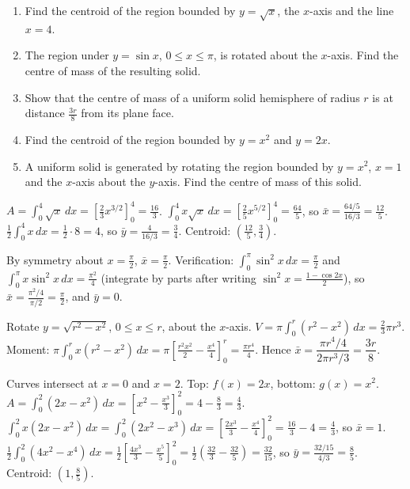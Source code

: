 \documentclass[11pt]{article}
\begin{document}
\begin{exercice}[Practice]
\begin{enumerate}
\item Find the centroid of the region bounded by $y = \sqrt{x}$, the $x$-axis and the line $x = 4$.
\item The region under $y = \sin x$, $0 \le x \le \pi$, is rotated about the $x$-axis. Find the centre of mass of the resulting solid.
\item Show that the centre of mass of a uniform solid hemisphere of radius $r$ is at distance $\tfrac{3r}{8}$ from its plane face.
\item Find the centroid of the region bounded by $y = x^2$ and $y = 2x$.
\item A uniform solid is generated by rotating the region bounded by $y = x^2$, $x = 1$ and the $x$-axis about the $y$-axis. Find the centre of mass of this solid.
\end{enumerate}
\end{exercice}

\begin{corrige}[Exercise 1]
$A = \int_0^4 \sqrt{x}\,dx = \left[\tfrac23 x^{3/2}\right]_0^4 = \tfrac{16}{3}$.
$\int_0^4 x\sqrt{x}\,dx = \left[\tfrac25 x^{5/2}\right]_0^4 = \tfrac{64}{5}$, so $\bar{x} = \tfrac{64/5}{16/3} = \tfrac{12}{5}$.
$\tfrac12\int_0^4 x\,dx = \tfrac12\cdot 8 = 4$, so $\bar{y} = \tfrac{4}{16/3} = \tfrac34$. Centroid: $\left(\tfrac{12}{5}, \tfrac34\right)$.
\end{corrige}

\begin{corrige}[Exercise 2]
By symmetry about $x = \tfrac{\pi}{2}$, $\bar{x} = \tfrac{\pi}{2}$. Verification: $\int_0^\pi \sin^2 x\,dx = \tfrac{\pi}{2}$ and $\int_0^\pi x\sin^2 x\,dx = \tfrac{\pi^2}{4}$ (integrate by parts after writing $\sin^2 x = \tfrac{1-\cos 2x}{2}$), so $\bar{x} = \tfrac{\pi^2/4}{\pi/2} = \tfrac{\pi}{2}$, and $\bar{y} = 0$.
\end{corrige}

\begin{corrige}[Exercise 3]
Rotate $y = \sqrt{r^2 - x^2}$, $0 \le x \le r$, about the $x$-axis. $V = \pi\int_0^r (r^2 - x^2)\,dx = \tfrac23\pi r^3$. Moment: $\pi\int_0^r x(r^2 - x^2)\,dx = \pi\left[\tfrac{r^2x^2}{2} - \tfrac{x^4}{4}\right]_0^r = \tfrac{\pi r^4}{4}$. Hence $\bar{x} = \dfrac{\pi r^4/4}{2\pi r^3/3} = \dfrac{3r}{8}$.
\end{corrige}

\begin{corrige}[Exercise 4]
Curves intersect at $x=0$ and $x=2$. Top: $f(x)=2x$, bottom: $g(x)=x^2$.
$A = \int_0^2 (2x - x^2)\,dx = \left[x^2 - \frac{x^3}{3}\right]_0^2 = 4 - \frac{8}{3} = \frac{4}{3}$.
$\int_0^2 x(2x - x^2)\,dx = \int_0^2 (2x^2 - x^3)\,dx = \left[\frac{2x^3}{3} - \frac{x^4}{4}\right]_0^2 = \frac{16}{3} - 4 = \frac{4}{3}$, so $\bar{x} = 1$.
$\frac12\int_0^2 (4x^2 - x^4)\,dx = \frac12\left[\frac{4x^3}{3} - \frac{x^5}{5}\right]_0^2 = \frac12\left(\frac{32}{3} - \frac{32}{5}\right) = \frac{32}{15}$, so $\bar{y} = \frac{32/15}{4/3} = \frac{8}{5}$. Centroid: $\left(1, \frac{8}{5}\right)$.
\end{corrige}
\end{document}
